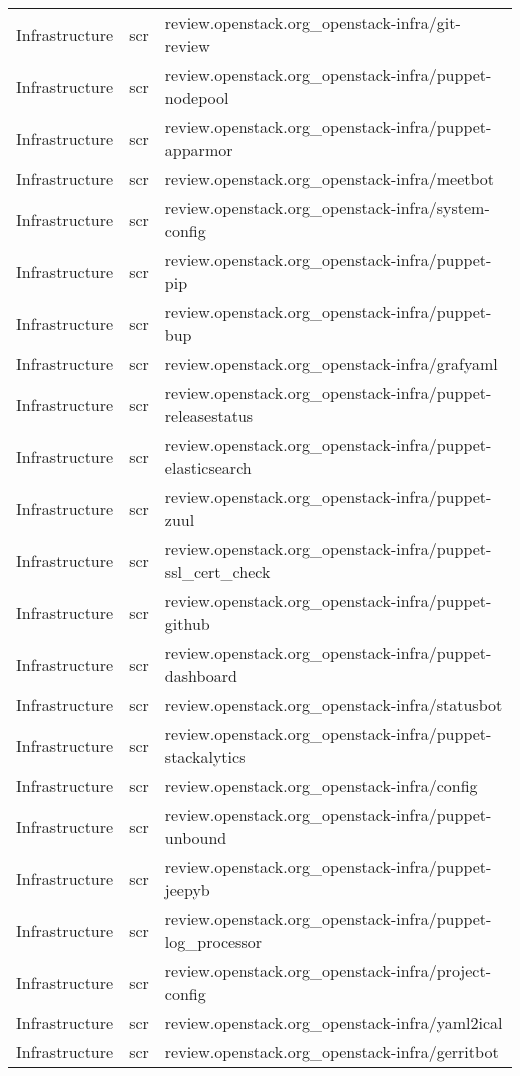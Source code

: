 \begin{center}
\begin{longtable}{|p{4cm}|p{1cm}|p{10cm}|}
Infrastructure&scr&review.openstack.org\_openstack-infra/git-review\\ 
Infrastructure&scr&review.openstack.org\_openstack-infra/puppet-nodepool\\ 
Infrastructure&scr&review.openstack.org\_openstack-infra/puppet-apparmor\\ 
Infrastructure&scr&review.openstack.org\_openstack-infra/meetbot\\ 
Infrastructure&scr&review.openstack.org\_openstack-infra/system-config\\ 
Infrastructure&scr&review.openstack.org\_openstack-infra/puppet-pip\\ 
Infrastructure&scr&review.openstack.org\_openstack-infra/puppet-bup\\ 
Infrastructure&scr&review.openstack.org\_openstack-infra/grafyaml\\ 
Infrastructure&scr&review.openstack.org\_openstack-infra/puppet-releasestatus\\ 
Infrastructure&scr&review.openstack.org\_openstack-infra/puppet-elasticsearch\\ 
Infrastructure&scr&review.openstack.org\_openstack-infra/puppet-zuul\\ 
Infrastructure&scr&review.openstack.org\_openstack-infra/puppet-ssl\_cert\_check\\ 
Infrastructure&scr&review.openstack.org\_openstack-infra/puppet-github\\ 
Infrastructure&scr&review.openstack.org\_openstack-infra/puppet-dashboard\\ 
Infrastructure&scr&review.openstack.org\_openstack-infra/statusbot\\ 
Infrastructure&scr&review.openstack.org\_openstack-infra/puppet-stackalytics\\ 
Infrastructure&scr&review.openstack.org\_openstack-infra/config\\ 
Infrastructure&scr&review.openstack.org\_openstack-infra/puppet-unbound\\ 
Infrastructure&scr&review.openstack.org\_openstack-infra/puppet-jeepyb\\ 
Infrastructure&scr&review.openstack.org\_openstack-infra/puppet-log\_processor\\ 
Infrastructure&scr&review.openstack.org\_openstack-infra/project-config\\ 
Infrastructure&scr&review.openstack.org\_openstack-infra/yaml2ical\\ 
Infrastructure&scr&review.openstack.org\_openstack-infra/gerritbot\\ 

\end{longtable}
\end{center}
